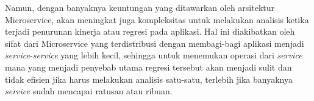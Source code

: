 
Namun, dengan banyaknya keuntungan yang ditawarkan oleh arsitektur Microservice, akan meningkat juga kompleksitas untuk melakukan analisis ketika terjadi penurunan kinerja atau regresi pada aplikasi. Hal ini diakibatkan oleh sifat dari Microservice yang terdistribusi dengan membagi-bagi aplikasi menjadi \textit{service}-\textit{service} yang lebih kecil, sehingga untuk menemukan operasi dari \textit{service} mana yang menjadi penyebab utama regresi tersebut akan menjadi sulit dan tidak efisien jika harus melakukan analisis satu-satu, terlebih jika banyaknya \textit{service} sudah mencapai ratusan atau ribuan.


